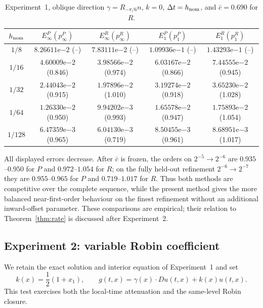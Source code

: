 \documentclass[11pt]{article}
\theoremstyle{definition}
\theoremstyle{remark}
\begin{document}
\begin{table}[htbp]
 \centering
 \footnotesize
 \setlength{\tabcolsep}{3.1pt}
 \renewcommand{\arraystretch}{0.94}
 \caption{Experiment~1, oblique direction $\gamma=R_{-\pi/6}n$, $k=0$,
 $\Delta t=h_{\rm nom}$, and $\bar c=0.690$ for $R$.}
 \label{tab:ex1-oblique}
 \begin{tabular}{ccccc}
  \toprule
  $h_{\rm nom}$ & $E_\infty^P(p_\infty^P)$ & $E_\infty^R(p_\infty^R)$
  & $E_1^P(p_1^P)$ & $E_1^R(p_1^R)$\\
  \midrule
  $1/8$   & $8.26611\mathrm e{-2}$ (--)    & $7.83111\mathrm e{-2}$ (--)    & $1.09936\mathrm e{-1}$ (--)    & $1.43293\mathrm e{-1}$ (--)\\
  $1/16$  & $4.60009\mathrm e{-2}$ (0.846) & $3.98566\mathrm e{-2}$ (0.974) & $6.03167\mathrm e{-2}$ (0.866) & $7.44555\mathrm e{-2}$ (0.945)\\
  $1/32$  & $2.44043\mathrm e{-2}$ (0.915) & $1.97896\mathrm e{-2}$ (1.010) & $3.19274\mathrm e{-2}$ (0.918) & $3.65230\mathrm e{-2}$ (1.028)\\
  \midrule
  $1/64$  & $1.26330\mathrm e{-2}$ (0.950) & $9.94202\mathrm e{-3}$ (0.993) & $1.65578\mathrm e{-2}$ (0.947) & $1.75893\mathrm e{-2}$ (1.054)\\
  $1/128$ & $6.47359\mathrm e{-3}$ (0.965) & $6.04130\mathrm e{-3}$ (0.719) & $8.50455\mathrm e{-3}$ (0.961) & $8.68951\mathrm e{-3}$ (1.017)\\
  \bottomrule
 \end{tabular}
\end{table}

All displayed errors decrease.  After $\bar c$ is frozen, the orders on
$2^{-5}\to2^{-6}$ are $0.935$--$0.950$ for $P$ and $0.972$--$1.054$ for
$R$; on the fully held-out refinement $2^{-6}\to2^{-7}$ they are
$0.955$--$0.965$ for $P$ and $0.719$--$1.017$ for $R$.  Thus both methods are
competitive over the complete sequence, while the present method gives the
more balanced near-first-order behaviour on the finest refinement without an
additional inward-offset parameter.  These comparisons are empirical; their
relation to Theorem~\ref{thm:rate} is discussed after Experiment~2.

\FloatBarrier


\subsection{Experiment 2: variable Robin coefficient}
\label{sec:variable-robin}

We retain the exact solution and interior equation of Experiment~1 and set
\[
 k(x)=\frac12(1+x_1),\qquad
 g(t,x)=\gamma(x)\cdot Du(t,x)+k(x)u(t,x).
\]
This test exercises both the local-time attenuation and the same-level Robin
closure.
\end{document}
